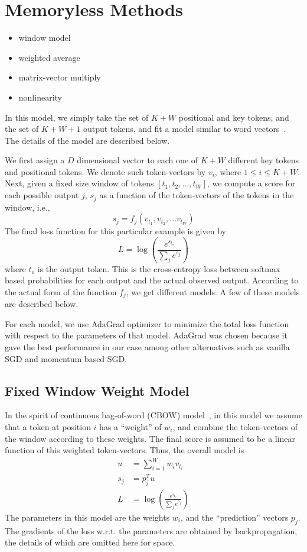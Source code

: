 \section{Memoryless Methods}
\label{sec:memoryless}

\begin{itemize}
  \item window model
  \item weighted average
  \item matrix-vector multiply
  \item nonlinearity
\end{itemize}

In this model, we simply take the set of $K+W$ positional and key tokens, and
the set of $K+W+1$ output tokens, and fit a model similar to word
vectors~\cite{ref:mikolov:wvec}. The details of the model are described below.

We first assign a $D$ dimensional vector to each one of $K+W$ different key
tokens and positional tokens. We denote such token-vectors by $v_i$, where $1
\leq i \leq K+W$. Next, given a fixed size window of tokens $[t_1, t_2, \ldots,
t_W]$, we compute a score for each possible output $j$, $s_j$ as a function of
the token-vectors of the tokens in the window, i.e.,
\[
s_j = f_j\left(v_{t_1}, v_{t_2}, \ldots v_{t_W}\right)
\]
The final loss function for this particular example is given by 
\[
L = \log\left(\frac{e^{s_{t_o}}}{\sum_j{e^{s_j}}}\right)
\]
where $t_o$ is the output token. This is the cross-entropy loss
between softmax based probabilities for each output and the actual observed
output. According to the actual form of the function $f_j$, we get different
models. A few of these models are described below.

For each model, we use {\sc AdaGrad} optimizer to minimize the total loss
function with respect to the parameters of that model. {\sc AdaGrad} was chosen
because it gave the best performance in our case among other alternatives such
as vanilla SGD and momentum based SGD.

\subsection{Fixed Window Weight Model}
In the spirit of continuous bag-of-word (CBOW) model~\cite{ref:mikolov:wvec}, in
this model we assume that a token at position $i$ has a ``weight'' of $w_i$, and
combine the token-vectors of the window according to these weights. The final
score is assumed to be a linear function of this weighted token-vectors. Thus,
the overall model is
\begin{align}
u &= \sum_{i=1}^{W}{w_i v_{t_i}}\\
s_j &= p_j^Tu\\
L &= \log\left(\frac{e^{s_{t_o}}}{\sum_j{e^{s_j}}}\right)
\end{align}
The parameters in this model are the weights $w_i$, and the ``prediction''
vectors $p_j$. The gradients of the loss w.r.t. the parameters are obtained by
backpropagation, the details of which are omitted here for space.

